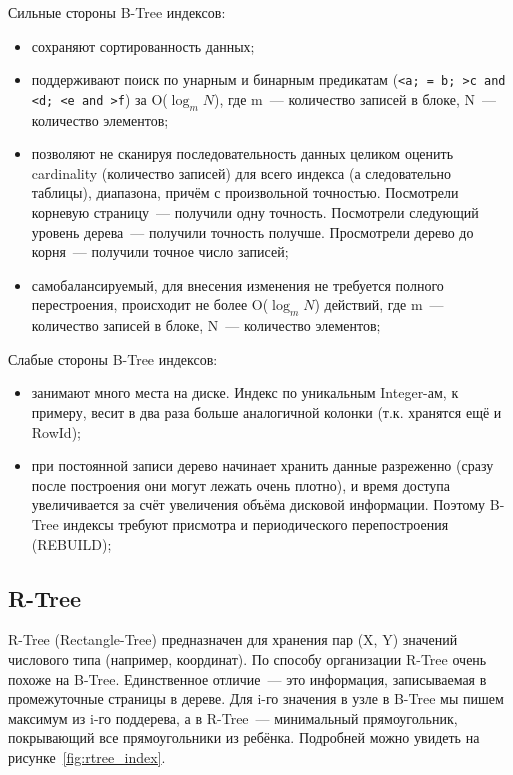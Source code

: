 Сильные стороны B-Tree индексов:

\begin{itemize}
  \item сохраняют сортированность данных;
  \item поддерживают поиск по унарным и бинарным предикатам (\lstinline!<a; = b; >c and <d; <e and >f!) за O($\log_m{N}$), где m~--- количество записей в блоке, N~--- количество элементов;
  \item позволяют не сканируя последовательность данных целиком оценить cardinality (количество записей) для всего индекса (а следовательно таблицы), диапазона, причём с произвольной точностью. Посмотрели корневую страницу~--- получили одну точность. Посмотрели следующий уровень дерева~--- получили точность получше. Просмотрели дерево до корня~--- получили точное число записей;
  \item самобалансируемый, для внесения изменения не требуется полного перестроения, происходит не более O($\log_m{N}$) действий, где m~--- количество записей в блоке, N~--- количество элементов;
\end{itemize}

Слабые стороны B-Tree индексов:

\begin{itemize}
  \item занимают много места на диске. Индекс по уникальным Integer-ам, к примеру, весит в два раза больше аналогичной колонки (т.к. хранятся ещё и RowId);
  \item при постоянной записи дерево начинает хранить данные разреженно (сразу после построения они могут лежать очень плотно), и время доступа увеличивается за счёт увеличения объёма дисковой информации. Поэтому B-Tree индексы требуют присмотра и периодического перепостроения (REBUILD);
\end{itemize}



\subsection{R-Tree}

R-Tree (Rectangle-Tree) предназначен для хранения пар (X, Y) значений числового типа (например, координат). По способу организации R-Tree очень похоже на B-Tree. Единственное отличие~--- это информация, записываемая в промежуточные страницы в дереве. Для i-го значения в узле в B-Tree мы пишем максимум из i-го поддерева, а в R-Tree~--- минимальный прямоугольник, покрывающий все прямоугольники из ребёнка. Подробней можно увидеть на рисунке~\ref{fig:rtree_index}.

